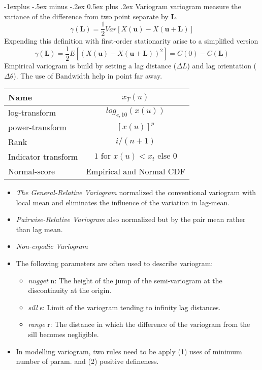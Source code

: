 \documentclass[10pt,landscape]{article}
\makeatletter
\renewcommand{\subsection}{\@startsection{subsection}{2}{0mm}%
                                {-1explus -.5ex minus -.2ex}%
                                {0.5ex plus .2ex}%
                                {\normalfont\normalsize\bfseries}}
\makeatother
\begin{document}
\begin{multicols}{3}
\subsection{Variogram}
variogram measure the variance of the difference from two point separate by $\mathbf{L}$.
\[\gamma(\mathbf{L})=\frac{1}{2}Var\left[X(\mathbf{u}) - X(\mathbf{u}+\mathbf{L})\right]\]
Expending this definition with first-order stationarity arise to a simplified version
\[\gamma(\mathbf{L})=\frac{1}{2} E\left[\left(X (\mathbf{u}) - X(\mathbf{u}+\mathbf{L})\right)^2\right] =C(0) -C(\mathbf{L})\]
Empirical variogram is build by setting a lag distance ($\Delta L$) and lag orientation ($\Delta \theta$). The use of Bandwidth help in point far away. \\
\begin{tabular}{lc}
Name			& $x_T(u)$  \\
\hline
log-transform 		& $log_{e,10}(x(u))$ 	 	\\
power-transform		& $[x(u)]^p$ 	 \\
Rank					& $i/(n+1) $ 	\\
Indicator transform	& $1 \text{ for } x(u)<x_t \text{ else } 0$   \\
Normal-score 		& Empirical and Normal CDF\\
\end{tabular}
\begin{itemize}
	\item \emph{The General-Relative Variogram} normalized the conventional variogram with local mean and eliminates the influence of the variation in lag-mean.
	\item \emph{Pairwise-Relative Variogram} also normalized but by the pair mean rather  than lag mean.
	\item \emph{Non-ergodic Variogram}
	\item The following parameters are often used to describe variogram:
	\begin{itemize}
		\item \emph{nugget} n: The height of the jump of the semi-variogram at the discontinuity at the origin.
		\item \emph{sill} s: Limit of the variogram tending to infinity lag distances.
		\item \emph{range} r: The distance in which the difference of the variogram from the sill becomes negligible.
	\end{itemize} 
	\item In modelling variogram, two rules need to be apply (1) uses of minimum number of param. and (2) positive defineness.

\end{itemize}
\end{multicols}
\end{document}
